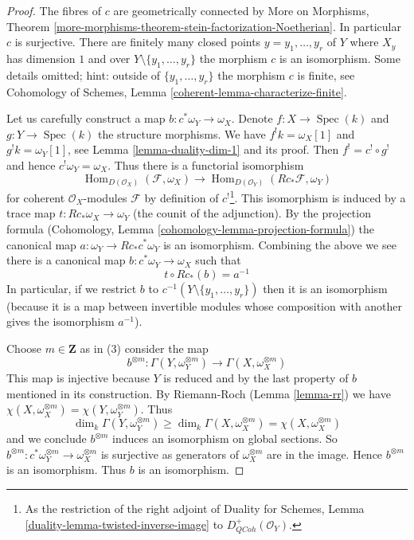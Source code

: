 \documentclass{stacks-project}
\theoremstyle{plain}
\theoremstyle{definition}
\theoremstyle{remark}
\numberwithin{equation}{subsection}
\def\Spec{\mathop{\mathrm{Spec}}}
\def\Hom{\mathop{\mathrm{Hom}}\nolimits}
\def\QCoh{\mathit{QCoh}}
\begin{document}
\begin{proof}
The fibres of $c$ are geometrically connected by
More on Morphisms, Theorem
\ref{more-morphisms-theorem-stein-factorization-Noetherian}.
In particular $c$ is surjective.
There are finitely many closed points $y = y_1, \ldots, y_r$ of $Y$ where
$X_y$ has dimension $1$ and over $Y \setminus \{y_1, \ldots, y_r\}$
the morphism $c$ is an isomorphism.
Some details omitted; hint: outside of $\{y_1, \ldots, y_r\}$
the morphism $c$ is finite, see
Cohomology of Schemes, Lemma \ref{coherent-lemma-characterize-finite}.

\medskip\noindent
Let us carefully construct a map $b : c^*\omega_Y \to \omega_X$.
Denote $f : X \to \Spec(k)$ and $g : Y \to \Spec(k)$ the structure
morphisms. We have $f^!k = \omega_X[1]$ and $g^!k = \omega_Y[1]$, see
Lemma \ref{lemma-duality-dim-1} and its proof. Then
$f^! = c^! \circ g^!$ and hence $c^!\omega_Y = \omega_X$.
Thus there is a functorial isomorphism
$$
\Hom_{D(\mathcal{O}_X)}(\mathcal{F}, \omega_X)
\longrightarrow
\Hom_{D(\mathcal{O}_Y)}(Rc_*\mathcal{F}, \omega_Y)
$$
for coherent $\mathcal{O}_X$-modules $\mathcal{F}$ by definition
of $c^!$\footnote{As the restriction of the right adjoint of
Duality for Schemes, Lemma \ref{duality-lemma-twisted-inverse-image} to
$D^+_\QCoh(\mathcal{O}_Y)$.}.
This isomorphism is induced by a trace map $t : Rc_*\omega_X \to \omega_Y$
(the counit of the adjunction). By the projection formula
(Cohomology, Lemma \ref{cohomology-lemma-projection-formula})
the canonical map $a : \omega_Y \to Rc_*c^*\omega_Y$ is an isomorphism.
Combining the above we see there is a canonical map
$b : c^*\omega_Y \to \omega_X$ such that
$$
t \circ Rc_*(b) = a^{-1}
$$
In particular, if we restrict $b$ to $c^{-1}(Y \setminus \{y_1, \ldots, y_r\})$
then it is an isomorphism (because it is a map between invertible modules
whose composition with another gives the isomorphism $a^{-1}$).

\medskip\noindent
Choose $m \in \mathbf{Z}$ as in (3) consider the map
$$
b^{\otimes m} :
\Gamma(Y, \omega_Y^{\otimes m})
\longrightarrow
\Gamma(X, \omega_X^{\otimes m})
$$
This map is injective because $Y$ is reduced and by the last
property of $b$ mentioned in its construction.
By Riemann-Roch (Lemma \ref{lemma-rr}) we have
$\chi(X, \omega_X^{\otimes m}) =\chi(Y, \omega_Y^{\otimes m})$.
Thus
$$
\dim_k \Gamma(Y, \omega_Y^{\otimes m}) \geq
\dim_k \Gamma(X, \omega_X^{\otimes m}) = \chi(X, \omega_X^{\otimes m})
$$
and we conclude $b^{\otimes m}$ induces an isomorphism on global
sections. So
$b^{\otimes m} : c^*\omega_Y^{\otimes m} \to \omega_X^{\otimes m}$
is surjective as generators of $\omega_X^{\otimes m}$ are in the image.
Hence $b^{\otimes m}$ is an isomorphism. Thus $b$ is an isomorphism.
\end{proof}
\end{document}
